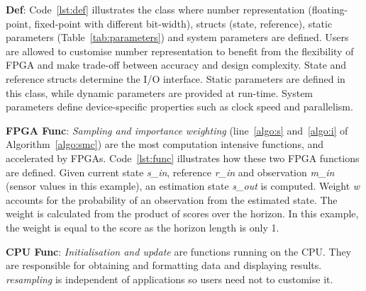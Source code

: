 \textbf{Def}: Code~\ref{lst:def} illustrates the class where number representation (floating-point, fixed-point with different bit-width), structs (state, reference), static parameters (Table~\ref{tab:parameters}) and system parameters are defined.
Users are allowed to customise number representation to benefit from the flexibility of FPGA and make trade-off between accuracy and design complexity.
State and reference structs determine the I/O interface.
Static parameters are defined in this class, while dynamic parameters are provided at run-time.
System parameters define device-specific properties such as clock speed and parallelism.

\textbf{FPGA Func}: \textit{Sampling and importance weighting} (line~\ref{algo:s} and~\ref{algo:i} of Algorithm~\ref{algo:smc}) are the most computation intensive functions, and accelerated by FPGAs.
Code~\ref{lst:func} illustrates how these two FPGA functions are defined.
Given current state \textit{s\_in}, reference \textit{r\_in} and observation \textit{m\_in} (sensor values in this example), an estimation state \textit{s\_out} is computed.
Weight \textit{w} accounts for the probability of an observation from the estimated state.
The weight is calculated from the product of scores over the horizon.
In this example, the weight is equal to the score as the horizon length is only 1. 

\textbf{CPU Func}: \textit{Initialisation and update} are functions running on the CPU.
They are responsible for obtaining and formatting data and displaying results.
\textit{resampling} is independent of applications so users need not to customise it.

